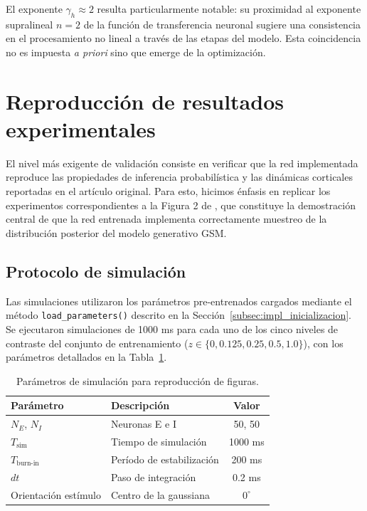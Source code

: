 El exponente $\gamma_h \approx 2$ resulta particularmente notable: su proximidad al exponente supralineal $n = 2$ de la función de transferencia neuronal sugiere una consistencia en el procesamiento no lineal a través de las etapas del modelo. Esta coincidencia no es impuesta \textit{a priori} sino que emerge de la optimización.


\section{Reproducción de resultados experimentales}
\label{sec:res_figures}

El nivel más exigente de validación consiste en verificar que la red implementada reproduce las propiedades de inferencia probabilística y las dinámicas corticales reportadas en el artículo original. Para esto, hicimos énfasis en replicar los experimentos correspondientes a la Figura 2 de \citet{echeveste2020cortical}, que constituye la demostración central de que la red entrenada implementa correctamente muestreo de la distribución posterior del modelo generativo \acrshort{GSM}.

\subsection{Protocolo de simulación}
\label{subsec:res_protocol}

Las simulaciones utilizaron los parámetros pre-entrenados cargados mediante el método \texttt{load\_parameters()} descrito en la Sección~\ref{subsec:impl_inicializacion}. Se ejecutaron simulaciones de 1000 ms para cada uno de los cinco niveles de contraste del conjunto de entrenamiento ($z \in \{0, 0.125, 0.25, 0.5, 1.0\}$), con los parámetros detallados en la Tabla~\ref{tab:simulation_params}.

\begin{table}[H]
\centering
\caption{Parámetros de simulación para reproducción de figuras.}
\label{tab:simulation_params}
\begin{tabular}{llc}
\toprule
\textbf{Parámetro} & \textbf{Descripción} & \textbf{Valor} \\
\midrule
$N_E$, $N_I$ & Neuronas E e I & 50, 50 \\
$T_{\text{sim}}$ & Tiempo de simulación & 1000 ms \\
$T_{\text{burn-in}}$ & Período de estabilización & 200 ms \\
$dt$ & Paso de integración & 0.2 ms \\
Orientación estímulo & Centro de la gaussiana & $0^\circ$ \\
\bottomrule
\end{tabular}
\end{table}

